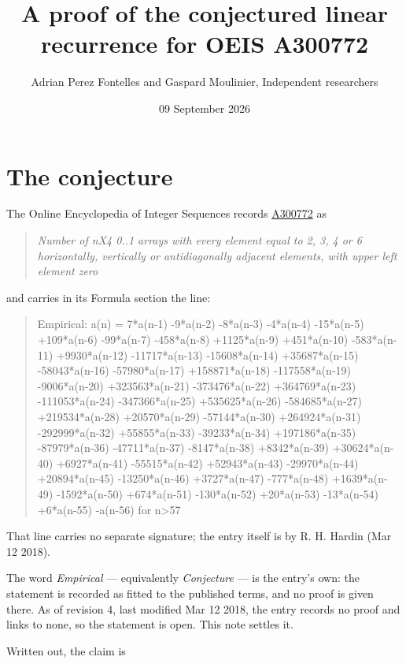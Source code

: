 \documentclass[11pt]{article}
\title{A proof of the conjectured linear recurrence for OEIS A300772}
\author{Adrian Perez Fontelles and Gaspard Moulinier, Independent researchers}
\date{09 September 2026}
\theoremstyle{definition}
\begin{document}
\maketitle
\section{The conjecture}

The Online Encyclopedia of Integer Sequences records \href{https://oeis.org/A300772}{A300772} as

\begin{quote}\itshape Number of nX4 0..1 arrays with every element equal to 2, 3, 4 or 6 horizontally, vertically or antidiagonally adjacent elements, with upper left element zero\end{quote}

and carries in its Formula section the line:

\begin{quote}\ttfamily Empirical: a(n) = 7*a(n-1) -9*a(n-2) -8*a(n-3) -4*a(n-4) -15*a(n-5) +109*a(n-6) -99*a(n-7) -458*a(n-8) +1125*a(n-9) +451*a(n-10) -583*a(n-11) +9930*a(n-12) -11717*a(n-13) -15608*a(n-14) +35687*a(n-15) -58043*a(n-16) -57980*a(n-17) +158871*a(n-18) -117558*a(n-19) -9006*a(n-20) +323563*a(n-21) -373476*a(n-22) +364769*a(n-23) -111053*a(n-24) -347366*a(n-25) +535625*a(n-26) -584685*a(n-27) +219534*a(n-28) +20570*a(n-29) -57144*a(n-30) +264924*a(n-31) -292999*a(n-32) +55855*a(n-33) -39233*a(n-34) +197186*a(n-35) -87979*a(n-36) -47711*a(n-37) -8147*a(n-38) +8342*a(n-39) +30624*a(n-40) +6927*a(n-41) -55515*a(n-42) +52943*a(n-43) -29970*a(n-44) +20894*a(n-45) -13250*a(n-46) +3727*a(n-47) -777*a(n-48) +1639*a(n-49) -1592*a(n-50) +674*a(n-51) -130*a(n-52) +20*a(n-53) -13*a(n-54) +6*a(n-55) -a(n-56) for n>57\end{quote}

That line carries no separate signature; the entry itself is by R. H. Hardin (Mar 12 2018).

The word {\itshape Empirical} --- equivalently {\itshape Conjecture} --- is the entry's own: the statement is recorded as fitted to the published terms, and no proof is given there. As of revision 4, last modified Mar 12 2018, the entry records no proof and links to none, so the statement is open. This note settles it.

Written out, the claim is
\end{document}
